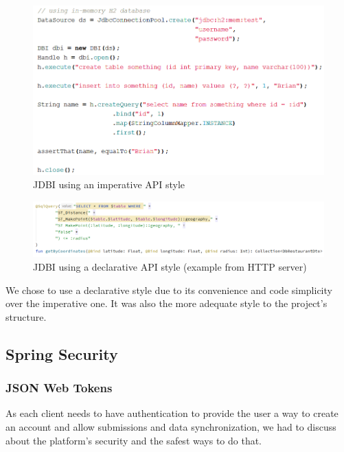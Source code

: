 \begin{figure}[H]
    \begin{center}
        \includegraphics[scale=0.5]{_figures/fluentApiJdbi.png}
        \caption{JDBI using an imperative API style}
    \end{center}
\end{figure}

\begin{figure}[H]
    \begin{center}
        \includegraphics[scale=0.5]{_figures/sqlObjectJdbi.png}
        \caption{JDBI using a declarative API style (example from HTTP server)}
    \end{center}
\end{figure}

We chose to use a declarative style due to its convenience and code simplicity
over the imperative one. It was also the more adequate style to the project's structure. 

\subsection{Spring Security}

\subsubsection{JSON Web Tokens}

As each client needs to have authentication to provide the user a way to create an account and allow submissions and data synchronization,
we had to discuss about the platform's security and the safest ways to do that.\\


